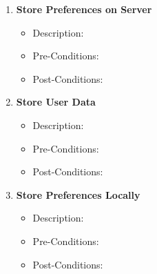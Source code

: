 \begin{enumerate}
\begin{itemize}
	\end{itemize}
	
	\item \textbf{Store Preferences on Server}
	\begin{itemize}
		\item Description: \\
		
		\item Pre-Conditions: \\
		
		\item Post-Conditions: \\
	
	\end{itemize}
	
	\item \textbf{Store User Data}
	\begin{itemize}
		\item Description: \\
		
		\item Pre-Conditions: \\
		
		\item Post-Conditions: \\
	
	\end{itemize}
	
	\item \textbf{Store Preferences Locally}
	\begin{itemize}
		\item Description: \\
	
		\item Pre-Conditions: \\
		
		\item Post-Conditions: \\
	
	\end{itemize}
\end{enumerate}
